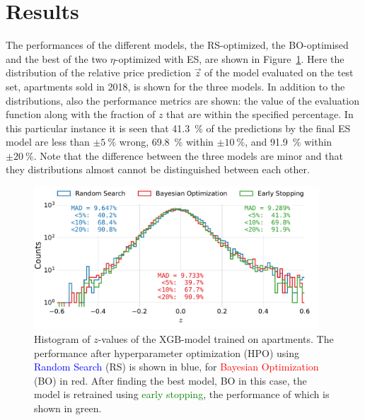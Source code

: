 \FloatBarrier
\section{Results}

The performances of the different models, the RS-optimized, the BO-optimised and the best of the two $\eta$-optimized with ES, are shown in Figure~\ref{fig:h:CV_res_performance_ejer}. Here the distribution of the relative price prediction $\vec{z}$ of the model evaluated on the test set, apartments sold in \num{2018}, is shown for the three models. In addition to the distributions, also the performance metrics are shown: the value of the evaluation function along with the fraction of $z$ that are within the specified percentage. In this particular instance it is seen that \SI{41.3}{\percent} of the predictions by the final ES model are less than $\pm\SI{5}{\percent}$ wrong, \SI{69.8}{\percent} within $\pm\SI{10}{\percent}$, and \SI{91.9}{\percent} within $\pm\SI{20}{\percent}$. Note that the difference between the three models are minor and that they distributions almost cannot be distinguished between each other. 

\begin{figure}[h!]
  \includegraphics[width=0.95\textwidth, trim=0 0 0 0, clip]{figures/housing/Ejerlejlighed_v19_cut_all_Ncols_all_xgb_z_hist_metrics.pdf}
  \caption[Performance of XGB-model on apartment prices]
          {Histogram of $z$-values of the XGB-model trained on apartments. The performance after hyperparameter optimization (HPO) using \textcolor{blue}{Random Search} (RS) is shown in blue, for \textcolor{red}{Bayesian Optimization} (BO) in red. After finding the best model, BO in this case, the model is retrained using \textcolor{green}{early stopping}, the performance of which is shown in green.
          } 
  \label{fig:h:CV_res_performance_ejer}
\end{figure}

